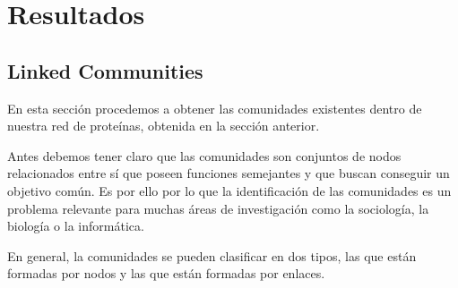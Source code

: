 
\section{Resultados}

\subsection{Linked Communities}
En esta sección procedemos a obtener las comunidades existentes dentro de nuestra red de proteínas, obtenida en la sección anterior.

Antes debemos tener claro que las comunidades son conjuntos de nodos relacionados entre sí que poseen funciones semejantes y que buscan conseguir un objetivo común. Es por ello por lo que la identificación de las comunidades es un problema relevante para muchas áreas de investigación como la sociología, la biología o la informática.

En general, la comunidades se pueden clasificar en dos tipos, las que están formadas por nodos y las que están formadas por enlaces.

